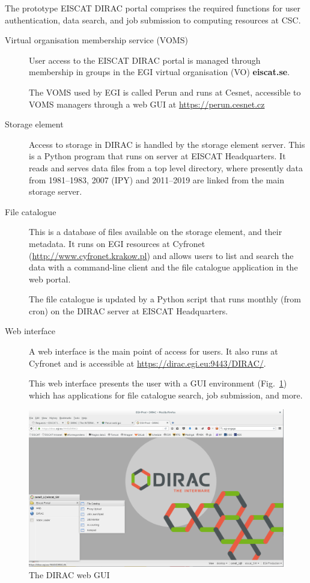 \documentclass[a4paper]{article}
\begin{document}
 
The prototype EISCAT DIRAC portal comprises the required functions for
user authentication, data search, and job submission to computing
resources at CSC.

\begin{description}

\item[Virtual organisation membership service (VOMS)] User access to the
  EISCAT DIRAC portal is managed through membership in groups in the
  EGI virtual organisation (VO) \textbf{eiscat.se}.  

  The VOMS used by EGI is called Perun and runs
  at Cesnet, accessible to VOMS managers through a web GUI at
  \url{https://perun.cesnet.cz}

\item[Storage element] Access to storage in DIRAC is handled by the storage element server. This is a Python program that runs on server at EISCAT Headquarters. It reads
  and serves data files from a top level directory, where presently data from 1981--1983, 2007 (IPY) and 2011--2019 are linked from the main storage server.

\item[File catalogue] This is a database of files available on the storage element, and their metadata.  It runs on EGI resources at Cyfronet
  (\url{http://www.cyfronet.krakow.pl}) and allows users
  to list and search the data with a command-line client and the file
  catalogue application in the web portal.  

  The file catalogue is updated by a Python script that runs monthly (from cron) on
  the DIRAC server at EISCAT Headquarters.

\item[Web interface] A web interface is the main point of access for
  users. It also runs at Cyfronet and is accessible at
  \url{https://dirac.egi.eu:9443/DIRAC/}. 

  This web interface presents the user with a GUI environment
  (Fig.~\ref{fig:portal}) which has applications for file catalogue
  search, job submission, and more.

\end{description}
\begin{figure}[htb]
  \centering
  \includegraphics[width=1.0\linewidth]{dirac-gui-desktop}
  \caption{The DIRAC web GUI}
  \label{fig:portal}
\end{figure}
\end{document}
